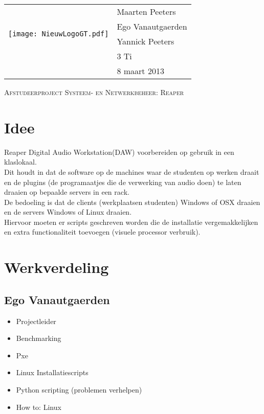 \documentclass[DIV=calc]{scrartcl}
\begin{document}
\noindent  \begin{tabular}{ll} 
\multirow{4}{4.5cm}[0mm]{\texttt{[image: NieuwLogoGT.pdf]} \hfill}
& Maarten Peeters \\
& Ego Vanautgaerden \\
& Yannick Peeters \\
& 3 Ti  \\
& 8 maart 2013 \\
\end{tabular}
\vspace{0.5cm}

\begin{center}
\Large \textsc{Afstudeerproject
Systeem- en Netwerkbeheer: Reaper} 
\end{center}

\vspace{0.5cm}
\tableofcontents


\newpage
\section{Idee}
Reaper Digital Audio Workstation(DAW) voorbereiden op gebruik in een klaslokaal.\\
Dit houdt in dat de software op de machines waar de studenten op werken draait en de plugins (de programaatjes die de verwerking van audio doen) te laten draaien op bepaalde servers in een rack.\\
De bedoeling is dat de clients (werkplaatsen studenten) Windows of OSX draaien en de servers Windows of Linux draaien.\\
Hiervoor moeten er scripts geschreven worden die de installatie vergemakkelijken en extra functionaliteit toevoegen (visuele processor verbruik).
\section{Werkverdeling}
\subsection{Ego Vanautgaerden}
\begin{itemize}
		\item Projectleider
		\item Benchmarking
		\item Pxe
		\item Linux Installatiescripts
		\item Python scripting (problemen verhelpen)
		\item How to: Linux
	\end{itemize}
\end{document}
